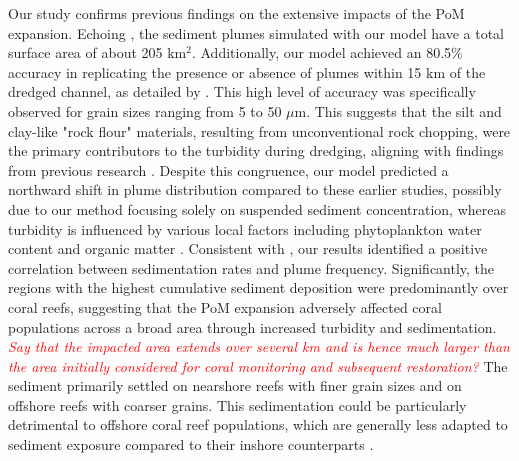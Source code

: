 \documentclass[preprint,12pt,authoryear]{elsarticle}
\newcommand{\emphc}[1]{\emph{\textcolor{red}{#1}}}
\begin{document}
Our study confirms previous findings on the extensive impacts of the PoM expansion. Echoing \cite{barnes2015sediment}, the sediment plumes simulated with our model have a total surface area of about 205 km$^2$. Additionally, our model achieved an 80.5\% accuracy in replicating the presence or absence of plumes within 15 km of the dredged channel, as detailed by \cite{cunning2019extensive}. This high level of accuracy was specifically observed for grain sizes ranging from 5 to 50 $\mu$m. This suggests that the silt and clay-like "rock flour" materials, resulting from unconventional rock chopping, were the primary contributors to the turbidity during dredging, aligning with findings from previous research \citep{storlazzi2015influence,fourney2017additive}. Despite this congruence, our model predicted a northward shift in plume distribution compared to these earlier studies, possibly due to our method focusing solely on suspended sediment concentration, whereas turbidity is influenced by various local factors including phytoplankton water content and organic matter \citep{gray2000comparability,thackston2000improved}. Consistent with \cite{cunning2019extensive}, our results identified a positive correlation between sedimentation rates and plume frequency. Significantly, the regions with the highest cumulative sediment deposition were predominantly over coral reefs, suggesting that the PoM expansion adversely affected coral populations across a broad area through increased turbidity and sedimentation. \emphc{Say that the impacted area extends over several km and is hence much larger than the area initially considered for coral monitoring and subsequent restoration?} The sediment primarily settled on nearshore reefs with finer grain sizes and on offshore reefs with coarser grains. This sedimentation could be particularly detrimental to offshore coral reef populations, which are generally less adapted to sediment exposure compared to their inshore counterparts \citep{wolanski2005fine}.
\end{document}
